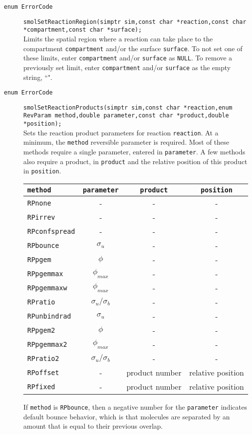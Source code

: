 \documentclass {book}
\begin{document}
\begin{description}
\item[\texttt{enum ErrorCode}]
\texttt{smolSetReactionRegion(simptr sim,const char *reaction,const char *compartment,const char *surface);}
\hfill \\
Limits the spatial region where a reaction can take place to the compartment \texttt{compartment} and/or the surface \texttt{surface}.  To not set one of these limits, enter \texttt{compartment} and/or \texttt{surface} as \texttt{NULL}.  To remove a previously set limit, enter \texttt{compartment} and/or \texttt{surface} as the empty string, ``".

\item[\texttt{enum ErrorCode}]
\texttt{smolSetReactionProducts(simptr sim,const char *reaction,enum RevParam method,double parameter,const char *product,double *position);}
\hfill \\
Sets the reaction product parameters for reaction \texttt{reaction}.  At a minimum, the \texttt{method} reversible parameter is required.  Most of these methods require a single parameter, entered in \texttt{parameter}.  A few methods also require a product, in \texttt{product} and the relative position of this product in \texttt{position}.

\begin{longtable}[c]{lccc}
\texttt{method} & \texttt{parameter} & \texttt{product} & \texttt{position}\\
\hline
\texttt{RPnone} & - & - & -\\
\texttt{RPirrev} & - & - & -\\
\texttt{RPconfspread} & - & - & -\\
\texttt{RPbounce} & $\sigma_u$ & - & -\\
\texttt{RPpgem} & $\phi$ & - & -\\
\texttt{RPpgemmax} & $\phi_{max}$ & - & -\\
\texttt{RPpgemmaxw} & $\phi_{max}$ & - & -\\
\texttt{RPratio} & $\sigma_u/\sigma_b$ & - & -\\
\texttt{RPunbindrad} & $\sigma_u$ & - & -\\
\texttt{RPpgem2} & $\phi$ & - & -\\
\texttt{RPpgemmax2} & $\phi_{max}$ & - & -\\
\texttt{RPratio2} & $\sigma_u/\sigma_b$ & - & -\\
\texttt{RPoffset} & - & product number & relative position\\
\texttt{RPfixed} & - & product number & relative position\\
\end{longtable}

If \texttt{method} is \texttt{RPbounce}, then a negative number for the \texttt{parameter} indicates default bounce behavior, which is that molecules are separated by an amount that is equal to their previous overlap.

\end{description}
\end{document}
